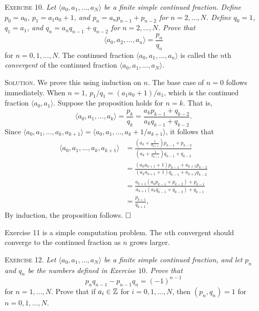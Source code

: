 \documentclass[11pt, leqno]{article}
\newcommand{\done}{\ensuremath{\hfill\square}}
\begin{document}
\textsc{Exercise 10}. \emph{Let $\langle a_0, a_1,\ldots,a_N \rangle$ be a finite simple continued fraction. Define $p_0 = a_0$, $p_1 = a_1a_0+1$, and $p_n = a_np_{n-1} + p_{n-2}$ for $n=2,\ldots, N$. Define $q_0=1$, $q_1=a_1$, and $q_n = a_nq_{n-1} + q_{n-2}$ for $n=2,\ldots, N$. Prove that 
\begin{displaymath}
\langle a_0, a_2,\ldots,a_n \rangle = \frac{p_n}{q_n}
\end{displaymath}}for $n=0,1,\ldots, N$. The continued fraction $\langle a_0, a_1,\ldots,a_n \rangle $ is called the $n$th \emph{convergent} of the continued fraction $\langle a_0, a_1, \ldots, a_N\rangle$.

\textsc{Solution}. We prove this using induction on $n$. The base case of $n=0$ follows immediately. When $n=1$, $p_1/q_1 = (a_1a_0+1)/a_1$, which is the continued fraction $\langle a_0, a_1 \rangle$. Suppose the proposition holds for $n=k$. That is, 
\begin{displaymath}
\langle a_0, a_1, \ldots, a_k \rangle = \frac{p_k}{q_k} = \frac{a_kp_{k-1} + q_{k-2}}{a_kq_{k-1} + q_{k-2}}.
\end{displaymath}
Since $\langle a_0, a_1, \ldots, a_k, a_{k+1} \rangle = \langle a_0, a_1, \ldots, a_k+1/a_{k+1} \rangle$, it follows that
\begin{align*}
  \langle a_0, a_1, \ldots, a_k, a_{k+1} \rangle &= \frac{\left( a_k+\frac{1}{a_{k+1}} \right)p_{k-1} + p_{k-2}}{\left( a_k+\frac{1}{a_{k+1}} \right)q_{k-1} + q_{k-2}} \\
                                                            &= \frac{(a_ka_{k+1} + 1)p_{k-1} + a_{k+1}p_{k-2}}{(a_ka_{k+1} + 1)q_{k-1} + a_{k+2}q_{k-2}} \\
                                                            &= \frac{a_{k+1}(a_kp_{k-1} + p_{k-2}) + p_{k-1}}{a_{k+1}(a_kq_{k-1} + q_{k-2}) + q_{k-1}} \\
  &= \frac{p_{k+1}}{q_{k+1}},
\end{align*}
By induction, the proposition follows. \done

Exercise 11 is a simple computation problem. The $n$th convergent should converge to the continued fraction as $n$ grows larger.

\textsc{Exercise 12}. \emph{Let $\langle a_0, a_1, \ldots, a_N\rangle$ be a finite simple continued fraction, and let $p_n$ and $q_n$ be the numbers defined in Exercise $10$. Prove that 
\begin{displaymath}
p_nq_{n-1} - p_{n-1}q_n = (-1)^{n-1}
\end{displaymath}}for $n=1,\ldots, N$. Prove that if $a_i \in \mathbb{Z}$ for $i=0,1,\ldots, N$, then $(p_n, q_n) = 1$ for $n=0,1,\ldots, N$.
\end{document}
